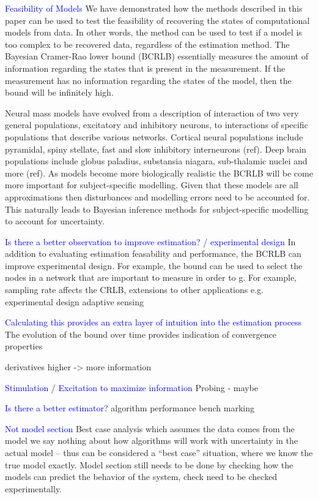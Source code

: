 \documentclass{article}
\newcommand{\brian}[1]{\textcolor{blue}{#1}}
\begin{document}
\brian{Feasibility of Models}
We have demonstrated how the methods described in this paper can be used to test the feasibility of recovering the states of computational models from data. In other words, the method can be used to test if a model is too complex to be recovered data, regardless of the estimation method. The Bayesian Cramer-Rao lower bound (BCRLB) essentially measures the amount of information regarding the states that is present in the measurement. If the measurement has no information regarding the states of the model, then the bound will be infinitely high. 

Neural mass models have evolved from a description of interaction of two very general populations, excitatory and inhibitory neurons, to interactions of specific populations that describe various networks. Cortical neural populations include pyramidal, spiny stellate, fast and slow inhibitory interneurons (ref). Deep brain populations include globus paladius, substansia niagara, sub-thalamic nuclei and more (ref). As models become more biologically realistic the BCRLB will be come more important for subject-specific modelling. Given that these models are all approximations then disturbances and modelling errors need to be accounted for. This naturally leads to Bayesian inference methods for subject-specific modelling to account for uncertainty. 

\brian{Is there a better observation to improve estimation? / experimental design}
In addition to evaluating estimation feasability and performance, the BCRLB can improve experimental design. For example, the bound can be used to select the nodes in a network that are important to measure in order to g. For example, 
sampling rate affects the CRLB, extensions to other applications e.g. experimental design
adaptive sensing

\brian{Calculating this provides an extra layer of intuition into the estimation process}
The evolution of the bound over time provides indication of convergence properties

derivatives higher -> more information

\brian{Stimulation / Excitation to maximize information}
Probing - maybe

\brian{Is there a better estimator?}
algorithm performance bench marking



\brian{Not model section}
Best case analysis which assumes the data comes from the model
we say nothing about how algorithms will work with uncertainty in the actual model -- thus can be considered a ``best case'' situation, where we know the true model exactly.
Model section still needs to be done by checking how the models can predict the behavior of the system, check need to be checked experimentally.
\end{document}
